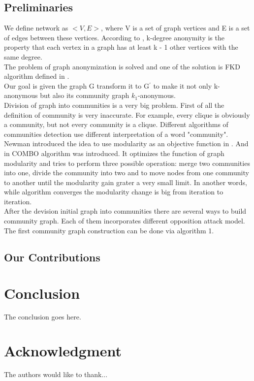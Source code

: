\documentclass[conference]{IEEEtran}
\begin{document}
\subsection{Preliminaries}
	We define network as $<V, E>$, where V is a set of graph vertices and E is a set of edges between these vertices.
	According to \cite{cheng2010k}, k-degree anonymity is the property that each vertex in a graph has at least k - 1 other vertices with the same degree.\\
	The problem of graph anonymization is solved and one of the solution is FKD algorithm defined in \cite{lu2012fast}.\\
	Our goal is given the graph G transform it to G$^\prime$ to make it not only k-anonymous but also its community graph $k_1$-anonymous.\\
	Division of graph into communities is a very big problem. First of all the definition of community is very inaccurate. For example, every clique is obviously a community, but not every community is a clique. Different algorithms of communities detection use different interpretation of a word "community". Newman introduced the idea to use modularity as an objective function in \cite{newman2012communities}. And in \cite{sobolevsky2014general} COMBO algorithm was introduced. It optimizes the function of graph modularity and tries to perform three possible operation: merge two communities into one, divide the community into two and to move nodes from one community to another until the modularity gain grater a very small limit. In another words, while algorithm converges the modularity change is big from iteration to iteration.\\
	After the devision initial graph into communities there are several ways to build community graph. Each of them incorporates different opposition attack model. The first community graph construction can be done via algorithm 1.

\subsection{Our Contributions}

\section{Conclusion}
	The conclusion goes here.

\section*{Acknowledgment}
	The authors would like to thank...



\end{document}
